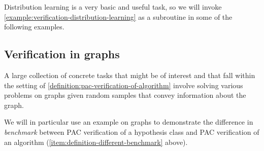\documentclass[11pt]{article}
\numberwithin{equation}{section}
\theoremstyle{definition}
\theoremstyle{plain}
\theoremstyle{definition}\newtheorem{notation}[theorem]{Notation}\theoremstyle{plain}\raggedbottom
\newcommand{\1}{\mathds{1}}
\begin{document}
Distribution learning is a very basic and useful task, so we will invoke \cref{example:verification-distribution-learning} as a subroutine in some of the following examples.

%

%

%
%

%
%

\subsection{Verification in graphs}

A large collection of concrete tasks that might be of interest and that fall within the setting of \cref{definition:pac-verification-of-algorithm} involve solving various problems on graphs given random samples that convey information about the graph.

We will in particular use an example on graphs to demonstrate the difference in \emph{benchmark} between PAC verification of a hypothesis class and PAC verification of an algorithm (\cref{item:definition-different-benchmark} above).
\end{document}
